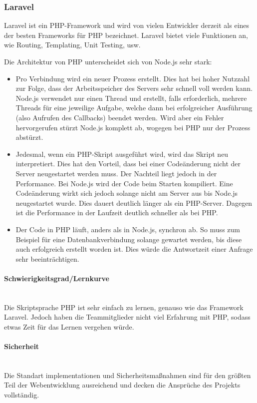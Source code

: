 \subsubsection{Laravel}
Laravel ist ein PHP-Framework und wird von vielen Entwickler derzeit als eines der besten Frameworks f\"ur PHP bezeichnet.
Laravel bietet viele Funktionen an, wie Routing, Templating, Unit Testing, usw.

Die Architektur von PHP unterscheidet sich von Node.js sehr stark:
\begin{itemize}
    \item Pro Verbindung wird ein neuer Prozess erstellt. Dies hat bei hoher Nutzzahl zur Folge, dass der Arbeitsspeicher des Servers sehr schnell voll werden kann.
    Node.js verwendet nur einen Thread und erstellt, falls erforderlich, mehrere Threads f\"ur eine jeweilige Aufgabe, welche dann bei erfolgreicher Ausf\"uhrung (also Aufrufen des Callbacks) beendet werden. Wird aber ein Fehler hervorgerufen st\"urzt Node.js komplett ab, wogegen bei PHP nur der Prozess abst\"urzt.
    \item Jedesmal, wenn ein PHP-Skript ausgef\"uhrt wird, wird das Skript neu interpretiert. Dies hat den Vorteil, dass bei einer Code\"anderung nicht der Server neugestartet werden muss. Der Nachteil liegt jedoch in der Performance.
    Bei Node.js wird der Code beim Starten kompiliert. Eine Code\"anderung wirkt sich jedoch solange nicht am Server aus bis Node.js neugestartet wurde. Dies dauert deutlich l\"anger als ein PHP-Server. Dagegen ist die Performance in der Laufzeit deutlich schneller als bei PHP.
    \item Der Code in PHP l\"auft, anders als in Node.js, synchron ab. So muss zum Beispiel f\"ur eine Datenbankverbindung solange gewartet werden, bis diese auch erfolgreich erstellt worden ist. Dies w\"urde die Antwortzeit einer Anfrage sehr beeintr\"achtigen.
\end{itemize}

\paragraph{Schwierigkeitsgrad/Lernkurve} \mbox{}\\
Die Skriptsprache PHP ist sehr einfach zu lernen, genauso wie das Framework Laravel. Jedoch haben die Teammitglieder nicht viel Erfahrung mit PHP, sodass etwas Zeit f\"ur das Lernen vergehen w\"urde.

\paragraph{Sicherheit} \mbox{}\\
Die Standart implementationen und Sicherheitsmaßnahmen sind für den größten Teil der Webentwicklung ausreichend und decken die Ansprüche des Projekts vollständig.

